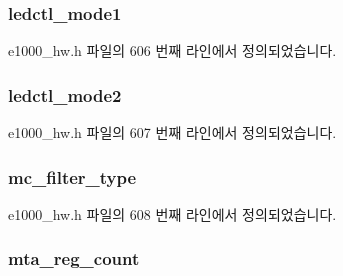 \subsubsection[{\texorpdfstring{ledctl\+\_\+mode1}{ledctl_mode1}}]{ ledctl\+\_\+mode1}\hypertarget{structe1000__mac__info_a899dad074fb9c82da18684bf096516de}{}\label{structe1000__mac__info_a899dad074fb9c82da18684bf096516de}


e1000\+\_\+hw.\+h 파일의 606 번째 라인에서 정의되었습니다.

\subsubsection[{\texorpdfstring{ledctl\+\_\+mode2}{ledctl_mode2}}]{ ledctl\+\_\+mode2}\hypertarget{structe1000__mac__info_a8980aa62165c00eb3ffe09afac3ee527}{}\label{structe1000__mac__info_a8980aa62165c00eb3ffe09afac3ee527}


e1000\+\_\+hw.\+h 파일의 607 번째 라인에서 정의되었습니다.

\subsubsection[{\texorpdfstring{mc\+\_\+filter\+\_\+type}{mc_filter_type}}]{ mc\+\_\+filter\+\_\+type}\hypertarget{structe1000__mac__info_a6be21e8f9f61aad861f4fcb95c1d037d}{}\label{structe1000__mac__info_a6be21e8f9f61aad861f4fcb95c1d037d}


e1000\+\_\+hw.\+h 파일의 608 번째 라인에서 정의되었습니다.

\subsubsection[{\texorpdfstring{mta\+\_\+reg\+\_\+count}{mta_reg_count}}]{ mta\+\_\+reg\+\_\+count}\hypertarget{structe1000__mac__info_a7e527eddad22e5d9eae888b8476a0379}{}\label{structe1000__mac__info_a7e527eddad22e5d9eae888b8476a0379}


